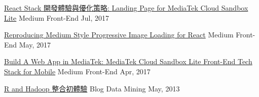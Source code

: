 \begin{cvhonors}
  \cvhonor
    {\href{https://medium.com/@evenchange4/react-stack-\%E9\%96\%8B\%E7\%99\%BC\%E9\%AB\%94\%E9\%A9\%97\%E8\%88\%87\%E5\%84\%AA\%E5\%8C\%96\%E7\%AD\%96\%E7\%95\%A5-b056da2fa0aa}{React Stack 開發體驗與優化策略: \textmd{Landing Page for MediaTek Cloud Sandbox Lite}}} %
    {Medium} %
    {Front-End} %
    {Jul, 2017} %

  \cvhonor
    {\href{https://medium.com/@evenchange4/reproducing-medium-style-progressive-image-loading-for-react-2e83bba0c608}{Reproducing Medium Style Progressive Image Loading for React}} %
    {Medium} %
    {Front-End} %
    {May, 2017} %

  \cvhonor
    {\href{https://medium.com/@evenchange4/build-a-web-app-in-mediatek-61b0a26215a0}{Build A Web App in MediaTek: \textmd{MediaTek Cloud Sandbox Lite Front-End Tech Stack for Mobile}}} %
    {Medium} %
    {Front-End} %
    {Apr, 2017} %

  \cvhonor
    {\href{https://old.michaelhsu.tw/2013/05/01/r-and-hadoop-\%E5\%88\%9D\%E9\%AB\%94\%E9\%A9\%97/}{R and Hadoop 整合初體驗}} %
    {Blog} %
    {Data Mining} %
    {May, 2013} %


\end{cvhonors}
